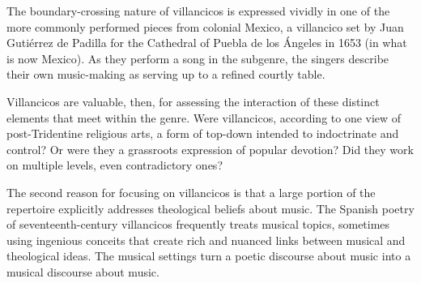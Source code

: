 The boundary-crossing nature of villancicos is expressed vividly in one of the more commonly performed pieces from colonial Mexico, a villancico set by Juan Gutiérrez de Padilla for the Cathedral of Puebla de los Ángeles in 1653 (in what is now Mexico).
As they perform a song in the  subgenre, the singers describe their own music-making as serving up  to a refined courtly table.

Villancicos are valuable, then, for assessing the interaction of these distinct elements that meet within the genre.
Were villancicos, according to one view of post-Tridentine religious arts, a form of top-down  intended to indoctrinate and control?
Or were they a grassroots expression of popular devotion?
Did they work on multiple levels, even contradictory ones?

The second reason for focusing on villancicos is that a large portion of the repertoire explicitly addresses theological beliefs about music.
The Spanish poetry of seventeenth-century villancicos frequently treats musical topics, sometimes using ingenious conceits that create rich and nuanced links between musical and theological ideas.
The musical settings turn a poetic discourse about music into a musical discourse about music.

